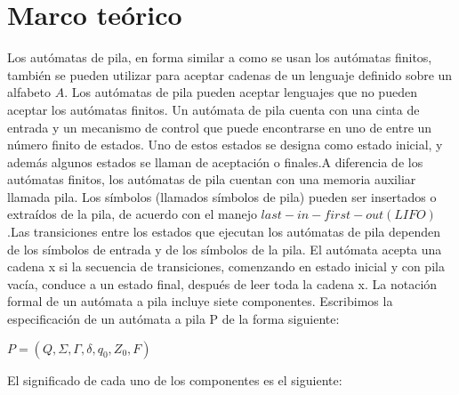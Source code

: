 \documentclass{article}
\begin{document}
\section{Marco teórico}
Los autómatas de pila, en forma similar a como se usan los autómatas finitos, también se pueden utilizar para aceptar cadenas de un lenguaje definido sobre un alfabeto $A$. \newline Los autómatas de pila pueden aceptar lenguajes que no pueden aceptar los autómatas finitos. Un autómata de pila cuenta con una cinta de entrada y un mecanismo de control que puede encontrarse en uno de entre un número finito de estados. Uno de estos estados se designa como estado inicial, y además algunos estados se llaman de aceptación o finales.\newline A diferencia de los autómatas finitos, los autómatas de pila cuentan con una memoria auxiliar llamada pila. Los símbolos (llamados símbolos de pila) pueden ser insertados o extraídos de la pila, de acuerdo con el manejo $last-in-first-out (LIFO)$.\newline\newline Las transiciones entre los estados que ejecutan los autómatas de pila dependen de los símbolos de entrada y de los símbolos de la pila. El autómata acepta una cadena x si la secuencia de transiciones, comenzando en estado inicial y con pila vacía, conduce a un estado final, después de leer toda la cadena x.\newline \newline
La notación formal de un autómata a pila incluye siete componentes. Escribimos la especificación de un autómata a pila P de la forma siguiente:
\begin{center}
    $P=(Q,\Sigma,\Gamma,\delta,q_0,Z_0,F)$
\end{center}
El significado de cada uno de los componentes es el siguiente:
\end{document}
